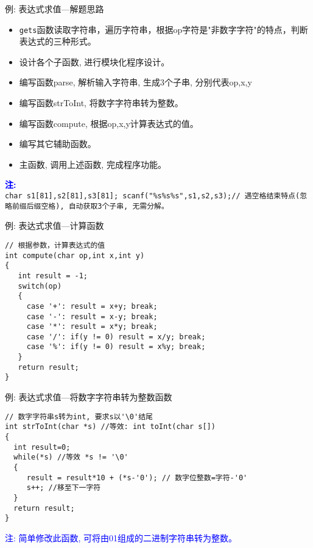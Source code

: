 \begin{frame}{例: 表达式求值---解题思路}
\vspace{-0.5cm}
\begin{itemize}
	\item \lstinline|gets|函数读取字符串，遍历字符串，根据op字符是"非数字字符"的特点，判断表达式的三种形式。\\
	\item 设计各个子函数, 进行模块化程序设计。
	\item 编写函数parse, 解析输入字符串, 生成3个子串, 分别代表op,x,y
	\item 编写函数strToInt, 将数字字符串转为整数。
	\item 编写函数compute, 根据op,x,y计算表达式的值。
	\item 编写其它辅助函数。
	\item 主函数, 调用上述函数, 完成程序功能。
\end{itemize}
\textbf{\textcolor{blue}{注:}}\\
	 \lstinline|char s1[81],s2[81],s3[81]; scanf("%s%s%s",s1,s2,s3);// 遇空格结束特点(忽略前缀后缀空格), 自动获取3个子串, 无需分解。|
\end{frame}

\begin{frame}{例: 表达式求值---计算函数}
\begin{lstlisting}
// 根据参数，计算表达式的值 
int compute(char op,int x,int y)
{
   int result = -1;
   switch(op)
   {
     case '+': result = x+y; break;
     case '-': result = x-y; break;
     case '*': result = x*y; break;
     case '/': if(y != 0) result = x/y; break;
     case '%': if(y != 0) result = x%y; break;
   }
   return result;
}
\end{lstlisting}
\end{frame}

\begin{frame}{例: 表达式求值---将数字字符串转为整数函数}
\begin{lstlisting}
// 数字字符串s转为int, 要求s以'\0'结尾 
int strToInt(char *s) //等效: int toInt(char s[]) 
{
  int result=0;
  while(*s) //等效 *s != '\0'
  {
     result = result*10 + (*s-'0'); // 数字位整数=字符-'0'
     s++; //移至下一字符 
  }
  return result;
} 
\end{lstlisting}
\textcolor{blue}{注: 简单修改此函数, 可将由01组成的二进制字符串转为整数。}
\end{frame}

